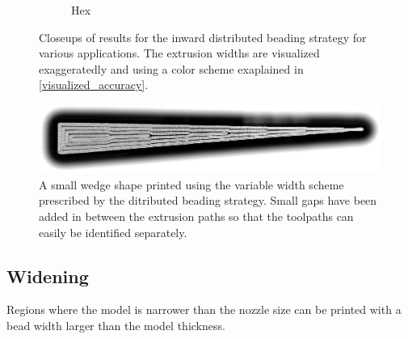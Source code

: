 \begin{figure}
\begin{subfigure}{\figwidth}
\caption{Hex}\label{applications_hex}
\end{subfigure}
\caption{
Closeups of results for the inward distributed beading strategy for various applications.
The extrusion widths are visualized exaggeratedly and using a color scheme exaplained in \cref{visualized_accuracy}.
}
\label{application_closeups}
\end{figure}


\begin{figure}
\centering
\includegraphics[width=\columnwidth]{sources/applications/wedge_print_v2.png}
\caption{
A small wedge shape printed using the variable width scheme prescribed by the ditributed beading strategy.
Small gaps have been added in between the extrusion paths so that the toolpaths can easily be identified separately.
}
\label{wedge_print}
\end{figure}


\subsection{Widening}
Regions where the model is narrower than the nozzle size can be printed with a bead width larger than the model thickness.